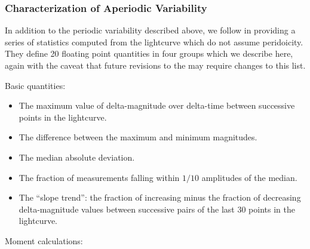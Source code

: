 \subsubsection{Characterization of Aperiodic Variability}

In addition to the periodic variability described above, we follow \cite{Richards11} in providing a series of statistics computed from the lightcurve which do not assume peridoicity. They define 20 floating point quantities in four groups which we describe here, again with the caveat that future revisions to the \DPDD{} may require changes to this list.

Basic quantities:

\begin{itemize}
\item{The maximum value of delta-magnitude over delta-time between successive points in the lightcurve.}
\item{The difference between the maximum and minimum magnitudes.}
\item{The median absolute deviation.}
\item{The fraction of measurements falling within $1/10$ amplitudes of the median.}
\item{The ``slope trend'': the fraction of increasing minus the fraction of decreasing delta-magnitude values between successive pairs of the last 30 points in the lightcurve.}
\end{itemize}

Moment calculations:

